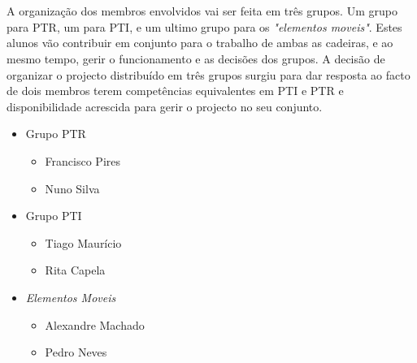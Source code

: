 \documentclass[12pt, a4paper, twoside]{report} %
\begin{document}

\clearpage


\\
\\
A organização dos membros envolvidos vai ser feita em três grupos.
Um grupo para PTR, um para PTI, e um ultimo grupo para os \textit {"elementos moveis"}. 
Estes alunos vão contribuir em conjunto para o trabalho de ambas as cadeiras, e ao mesmo tempo, gerir o funcionamento e as decisões dos grupos.
A decisão de organizar o projecto distribuído em três grupos surgiu para dar resposta ao facto de dois membros terem competências equivalentes em PTI e PTR e disponibilidade acrescida para gerir o projecto no seu conjunto.

\begin{itemize}
\item Grupo PTR
\begin{itemize}
	\item Francisco Pires
	\item Nuno Silva
\end{itemize}
\item Grupo PTI
\begin{itemize}
	\item Tiago Maurício
	\item Rita Capela
\end{itemize}
\item \textit{Elementos Moveis}
\begin{itemize}
	\item Alexandre Machado
	\item Pedro Neves
\end{itemize}
\end{itemize}

\end{document}
